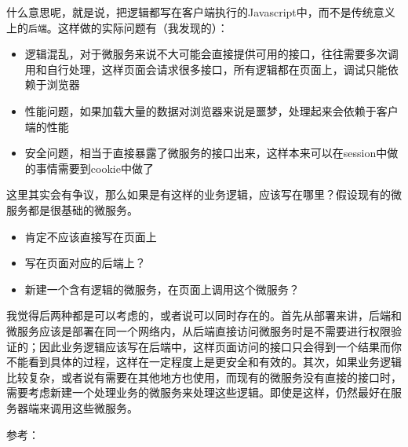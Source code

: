 \documentclass[12pt]{article}
\begin{document}
什么意思呢，就是说，把逻辑都写在客户端执行的Javascript中，而不是传统意义上的\texttt{后端}。这样做的实际问题有（我发现的）：

\begin{itemize}
\tightlist
\item
  逻辑混乱，对于微服务来说不大可能会直接提供可用的接口，往往需要多次调用和自行处理，这样页面会请求很多接口，所有逻辑都在页面上，调试只能依赖于浏览器
\item
  性能问题，如果加载大量的数据对浏览器来说是噩梦，处理起来会依赖于客户端的性能
\item
  安全问题，相当于直接暴露了微服务的接口出来，这样本来可以在session中做的事情需要到cookie中做了
\end{itemize}

这里其实会有争议，那么如果是有这样的业务逻辑，应该写在哪里？假设现有的微服务都是很基础的微服务。

\begin{itemize}
\tightlist
\item
  肯定不应该直接写在页面上
\item
  写在页面对应的后端上？
\item
  新建一个含有逻辑的微服务，在页面上调用这个微服务？
\end{itemize}

我觉得后两种都是可以考虑的，或者说可以同时存在的。首先从部署来讲，后端和微服务应该是部署在同一个网络内，从后端直接访问微服务时是不需要进行权限验证的；因此业务逻辑应该写在后端中，这样页面访问的接口只会得到一个结果而你不能看到具体的过程，这样在一定程度上是更安全和有效的。其次，如果业务逻辑比较复杂，或者说有需要在其他地方也使用，而现有的微服务没有直接的接口时，需要考虑新建一个处理业务的微服务来处理这些逻辑。即使是这样，仍然最好在服务器端来调用这些微服务。

参考：
\end{document}
